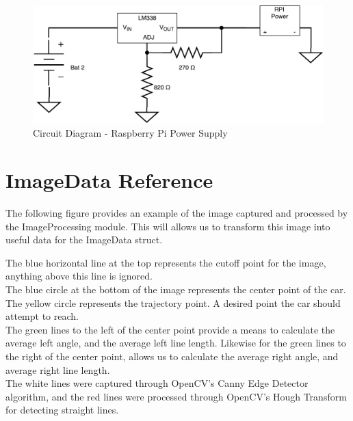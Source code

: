 \documentclass [10pt]{article}
\begin{document}
\begin{figure} [h!]
	\caption{Circuit Diagram - Raspberry Pi Power Supply}
	\centering
	\includegraphics [scale =0.7] {figures/PowerDiagram.pdf}
\end{figure}

\break

\newpage



\section{ImageData Reference} \label{ImageData Reference}
The following figure provides an example of the image captured and processed by the ImageProcessing module. This will allows us to transform this image into useful data for the ImageData struct.

The blue horizontal line at the top represents the cutoff point for the image, anything above this line is ignored.\\
The blue circle at the bottom of the image represents the center point of the car. \\
The yellow circle represents the trajectory point. A desired point the car should attempt to reach. \\
The green lines to the left of the center point provide a means to calculate the average left angle, and the average left line length. Likewise for the green lines to the right of the center point, allows us to calculate the average right angle, and average right line length. \\

The white lines were captured through OpenCV's Canny Edge Detector algorithm, and the red lines were processed through OpenCV's Hough Transform for detecting straight lines.
\end{document}
